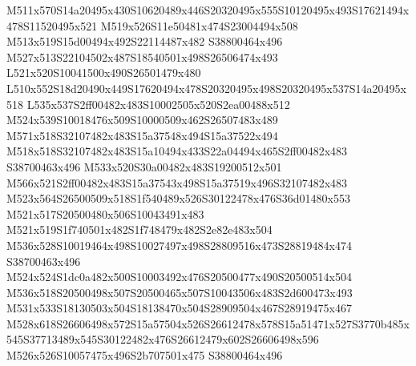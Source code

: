 \documentclass{article}
\begin{document}
\begin{multicols}{2}
M511x570S14a20495x430S10620489x446S20320495x555S10120495x493S17621494x478S11520495x521 M519x526S11e50481x474S23004494x508 M513x519S15d00494x492S22114487x482 S38800464x496 M527x513S22104502x487S18540501x498S26506474x493 L521x520S10041500x490S26501479x480 L510x552S18d20490x449S17620494x478S20320495x498S20320495x537S14a20495x518 L535x537S2ff00482x483S10002505x520S2ea00488x512 M524x539S10018476x509S10000509x462S26507483x489 M571x518S32107482x483S15a37548x494S15a37522x494 M518x518S32107482x483S15a10494x433S22a04494x465S2ff00482x483 S38700463x496 M533x520S30a00482x483S19200512x501 M566x521S2ff00482x483S15a37543x498S15a37519x496S32107482x483 M523x564S26500509x518S1f540489x526S30122478x476S36d01480x553 M521x517S20500480x506S10043491x483 M521x519S1f740501x482S1f748479x482S2e82e483x504 M536x528S10019464x498S10027497x498S28809516x473S28819484x474 S38700463x496 M524x524S1dc0a482x500S10003492x476S20500477x490S20500514x504 M536x518S20500498x507S20500465x507S10043506x483S2d600473x493 M531x533S18130503x504S18138470x504S28909504x467S28919475x467 M528x618S26606498x572S15a57504x526S26612478x578S15a51471x527S3770b485x545S37713489x545S30122482x476S26612479x602S26606498x596 M526x526S10057475x496S2b707501x475 S38800464x496









\end{multicols}
\end{document}
